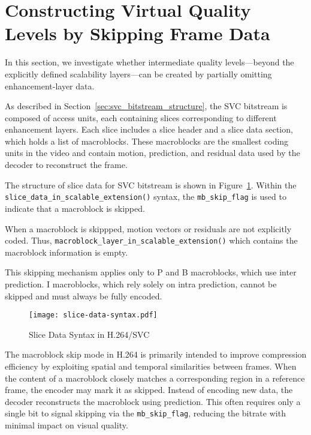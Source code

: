 
\section{Constructing Virtual Quality Levels by Skipping Frame Data}
\label{sec:virtual_quality_levels}


    In this section, we investigate whether intermediate quality levels—beyond the
    explicitly defined scalability layers—can be created by partially omitting
    enhancement-layer data.

    As described in Section~\ref{sec:svc_bitstream_structure}, the SVC bitstream is
    composed of access units, each containing slices corresponding to different
    enhancement layers. Each slice includes a slice header and a slice data section,
    which holds a list of macroblocks. These macroblocks are the smallest coding
    units in the video and contain motion, prediction, and residual data used by the
    decoder to reconstruct the frame.

    The structure of slice data for SVC bitstream is shown in
    Figure~\ref{fig:slice-data-syntax}.  Within the
    \texttt{slice\_data\_in\_scalable\_extension()} syntax, the
    \texttt{mb\_skip\_flag} is used to indicate that a macroblock is skipped.

    When a macroblock is skippped, motion vectors or residuals are not
    explicitly coded. Thus,
    \texttt{macroblock\_layer\_in\_scalable\_extension()} which contains the
    macroblock information is empty.

    This skipping mechanism applies only to P and B macroblocks, which use inter
    prediction. I macroblocks, which rely solely on intra prediction, cannot be
    skipped and must always be fully encoded.

    \begin{figure}
        \centering
        \texttt{[image: slice-data-syntax.pdf]}
        \caption{Slice Data Syntax in H.264/SVC}
        \label{fig:slice-data-syntax}
    \end{figure}

    The macroblock skip mode in H.264 is primarily intended to improve compression
    efficiency by exploiting spatial and temporal similarities between frames. When
    the content of a macroblock closely matches a corresponding region in a
    reference frame, the encoder may mark it as skipped. Instead of encoding new
    data, the decoder reconstructs the macroblock using prediction. This often
    requires only a single bit to signal skipping via the \texttt{mb\_skip\_flag},
    reducing the bitrate with minimal impact on visual quality.

